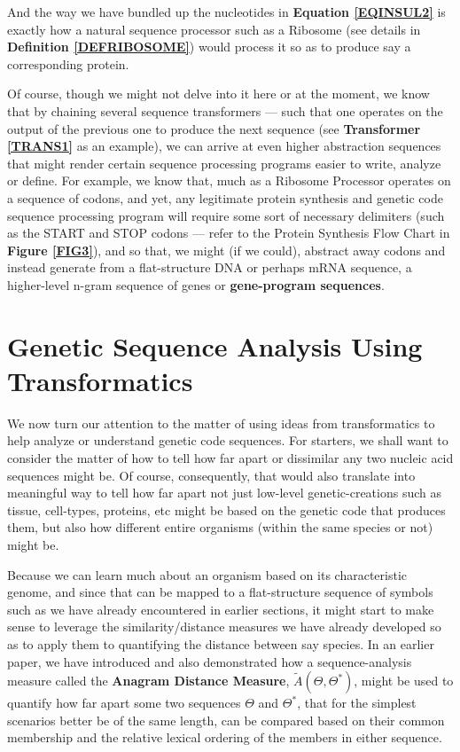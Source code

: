 \documentclass[a4paper, 18pt]{article} %
\begin{document}
And the way we have bundled up the nucleotides in \textbf{Equation \ref{EQINSUL2}} is exactly how a natural sequence processor such as a Ribosome (see details in \textbf{Definition \ref{DEFRIBOSOME}}) would process it so as to produce say a corresponding protein.

Of course, though we might not delve into it here or at the moment, we know that by chaining several sequence transformers --- such that one operates on the output of the previous one to produce the next sequence (see \textbf{Transformer \ref{TRANS1}} as an example), we can arrive at even higher abstraction sequences that might render certain sequence processing programs easier to write, analyze or define. For example, we know that, much as a Ribosome Processor operates on a sequence of codons, and yet, any legitimate protein synthesis and genetic code sequence processing program will require some sort of necessary delimiters (such as the START and STOP codons --- refer to the Protein Synthesis Flow Chart in \textbf{Figure \ref{FIG3}}), and so that, we might (if we could), abstract away codons and instead generate from a flat-structure DNA or perhaps mRNA sequence, a higher-level n-gram sequence of genes or \textbf{gene-program sequences}.


\section{Genetic Sequence Analysis Using Transformatics}
\label{SEC3}

We now turn our attention to the matter of using ideas from transformatics to help analyze or understand genetic code sequences. For starters, we shall want to consider the matter of how to tell how far apart or dissimilar any two nucleic acid sequences might be. Of course, consequently, that would also translate into meaningful way to tell how far apart not just low-level genetic-creations such as tissue, cell-types, proteins, etc might be based on the genetic code that produces them, but also how different entire organisms (within the same species or not) might be.

Because we can learn much about an organism based on its characteristic genome, and since that can be mapped to a flat-structure sequence of symbols such as we have already encountered in earlier sections, it might start to make sense to leverage the similarity/distance measures we have already developed so as to apply them to quantifying the distance between say species. In an earlier paper\cite{adtpaper}, we have introduced and also demonstrated how a sequence-analysis measure called the \textbf{Anagram Distance Measure}, $\tilde{A}(\Theta,\Theta^*)$, might be used to quantify how far apart some two sequences $\Theta$ and $\Theta^*$, that for the simplest scenarios better be of the same length, can be compared based on their common membership and the relative lexical ordering of the members in either sequence.
\end{document}
